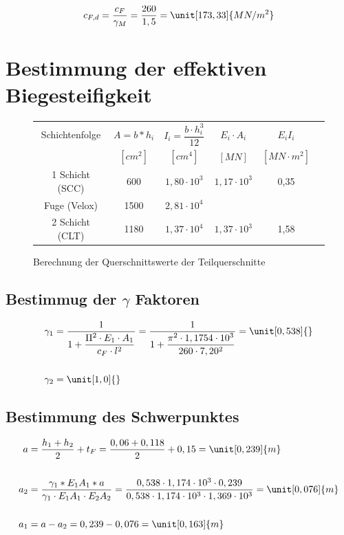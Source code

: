 \begin{align*}
c_{F,d}= \dfrac{c_{F}}{\gamma_{M}}=\dfrac{260}{1,5}=\unit[173,33]{MN/m^{2}}
\end{align*}

\section{Bestimmung der effektiven Biegesteifigkeit}
\unit[]{}
\begin{figure}[h!]
\caption{Berechnung der Querschnittswerte der Teilquerschnitte}
\begin{center}
\begin{tabular}{|c|c|c|c|c|c|}
\hline 
Schichtenfolge & $A=b*h_{i}$ & $I_{i}=\dfrac{b \cdot h_{i}^{3}}{12}$ & $E_{i}\cdot A_{i}$ & $E_{i}I_{i}$  \\ 

& $[cm^{2}]$ & $[cm^{4}]$ & $[MN]$ & $[MN \cdot m^{2}]$  \\ \hline 
\hline
1 Schicht (SCC) & 600 & $1,80 \cdot 10^{3}$ & $1,17 \cdot 10^{3}$ & 0,35  \\ 
\hline 
Fuge (Velox) & 1500 & $2,81  \cdot 10^{4}$ &  &   \\ 
\hline 
2 Schicht (CLT) & 1180 & $1,37 \cdot 10^{4}$ & $1,37 \cdot 10^{3}$ & 1,58  \\ 
\hline 
\end{tabular} 
\end{center}
\end{figure}


\subsection{Bestimmug der $\gamma$ Faktoren}
\begin{align*}
\gamma_{1}&=\dfrac{1}{1+\dfrac{\Pi^{2} \cdot E_{1} \cdot A_{1}}{c_{F} \cdot l^{2}}}=\dfrac{1}{1+\dfrac{\pi^{2} \cdot 1,1754 \cdot 10^{3}}{260 \cdot 7,20^{2}}}= \unit[0,538]{}\\\\
\gamma_{2}&=\unit[1,0]{}
\end{align*}



\subsection{Bestimmung des Schwerpunktes}
\begin{align*}
a&=\dfrac{h_{1}+h_{2}}{2}+t_{F}=\dfrac{0,06+0,118}{2}+0,15= \unit[0,239]{m}\\\\
a_{2}&=\dfrac{\gamma_{1}*E_{1}A_{1}*a}{\gamma_{1} \cdot E_{1}A_{1} \cdot E_{2}A_{2}}=\dfrac{0,538 \cdot 1,174 \cdot 10^{3} \cdot 0,239}{0,538 \cdot 1,174 \cdot 10^{3} \cdot 1,369 \cdot 10^{3}}= \unit[0,076]{m}\\\\
a_{1}&=a-a_{2}=0,239-0,076=\unit[0,163]{m}\\
\end{align*}
